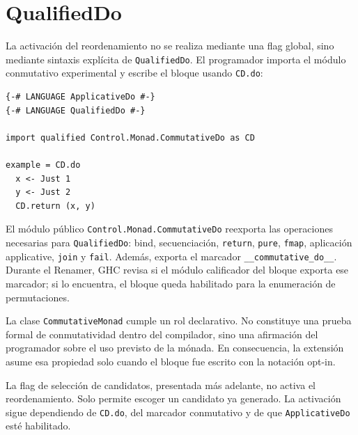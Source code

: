 
\section{QualifiedDo}

La activación del reordenamiento no se realiza mediante una flag global, sino mediante sintaxis explícita de \texttt{QualifiedDo}. El programador importa el módulo conmutativo experimental y escribe el bloque usando \texttt{CD.do}:

\begin{verbatim}
{-# LANGUAGE ApplicativeDo #-}
{-# LANGUAGE QualifiedDo #-}

import qualified Control.Monad.CommutativeDo as CD

example = CD.do
  x <- Just 1
  y <- Just 2
  CD.return (x, y)
\end{verbatim}

El módulo público \texttt{Control.Monad.CommutativeDo} reexporta las operaciones necesarias para \texttt{QualifiedDo}: bind, secuenciación, \texttt{return}, \texttt{pure}, \texttt{fmap}, aplicación applicative, \texttt{join} y \texttt{fail}. Además, exporta el marcador \texttt{\_\_commutative\_do\_\_}. Durante el Renamer, \textsf{GHC} revisa si el módulo calificador del bloque exporta ese marcador; si lo encuentra, el bloque queda habilitado para la enumeración de permutaciones.

La clase \texttt{CommutativeMonad} cumple un rol declarativo. No constituye una prueba formal de conmutatividad dentro del compilador, sino una afirmación del programador sobre el uso previsto de la mónada. En consecuencia, la extensión asume esa propiedad solo cuando el bloque fue escrito con la notación opt-in.

La flag de selección de candidatos, presentada más adelante, no activa el reordenamiento. Solo permite escoger un candidato ya generado. La activación sigue dependiendo de \texttt{CD.do}, del marcador conmutativo y de que \texttt{ApplicativeDo} esté habilitado.
